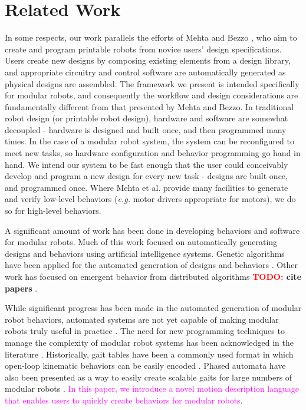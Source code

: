 \documentclass[conference]{IEEEtran}
\theoremstyle{definition}
\newcommand{\TODO}[1]{ {\bf \textcolor{red}{TODO:} #1 }}
\newcommand{\abt}[1]{\textcolor{magenta}{#1}}
\begin{document}
\section{Related Work}
\label{sec:related-work}
In some respects, our work parallels the efforts of Mehta \cite{mehta2014design}
and Bezzo \cite{bezzo2014demo}, who aim to create and program printable robots from
novice users' design specifications.  Users create new designs by composing
existing elements from a design library, and appropriate circuitry and
control software are automatically generated as physical designs are assembled. The framework we present is
intended specifically for modular robots, and consequently the workflow and design considerations are fundamentally different
from that presented by Mehta and Bezzo.  In
traditional robot design (or printable robot design), hardware and software are somewhat
decoupled - hardware is
designed and built once, and then programmed many times.  In the case of a modular robot system, the system can be reconfigured to meet new tasks,
so hardware configuration and behavior programming go hand in hand.  We intend
our system to be fast enough that the user could conceivably develop and program
a new design for every new task - designs are built once, and programmed once.  Where Mehta et al. provide many facilities to generate and verify
low-level behaviors (\textit{e.g.} motor drivers appropriate for motors), we do so for
high-level behaviors.

A significant amount of work has been done in developing behaviors and software
for modular robots. Much of this work focused on automatically
generating designs and behaviors using artificial intelligence systems. Genetic
algorithms have been applied for the automated generation of designs
and behaviors \cite{hornby2003generative}. Other work has
focused on emergent behavior from distributed algorithms \TODO{cite papers}.

While significant progress has been made in the automated generation of modular robot behaviors,
automated systems are not yet capable of making modular robots truly useful in practice
\cite{yim2007modular}.  The need for new programming techniques to manage the complexity
of modular robot systems has been acknowledged in the literature \cite{yim2000modular}.
Historically, gait tables have been a commonly used format in which open-loop kinematic
behaviors can be easily encoded \cite{yim1994locomotion}. Phased automata have also
been presented as a way to easily create scalable gaits for large numbers of modular
robots \cite{zhang2003phase}. \abt{In this paper, we introduce a novel motion description
language that enables users to quickly create behaviors for modular robots}.
\end{document}
